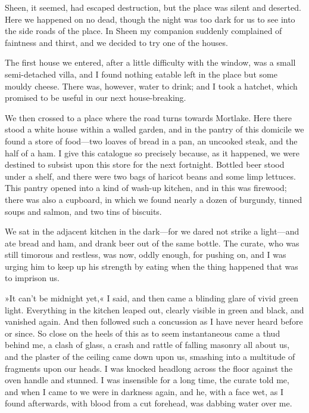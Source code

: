Sheen, it seemed, had escaped destruction, but the place was silent and deserted. Here we happened on no dead, though the night was too dark for us to see into the side roads of the place. In Sheen my companion suddenly complained of faintness and thirst,\label{cylinder5b} and we decided to try one of the houses.

The first house we entered, after a little difficulty with the window, was a small semi-detached villa, and I found nothing eatable left in the place but some mouldy cheese. There was, however, water to drink; and I took a hatchet, which promised to be useful in our next house-breaking.

We then crossed to a place where the road turns towards Mortlake. Here there stood a white house within a walled garden, and in the pantry of this domicile we found a store of food—two loaves of bread in a pan, an uncooked steak, and the half of a ham. I give this catalogue so precisely because, as it happened, we were destined to subsist upon this store for the next fortnight. Bottled beer stood under a shelf, and there were two bags of haricot beans and some limp lettuces. This pantry opened into a kind of wash-up kitchen, and in this was firewood; there was also a cupboard, in which we found nearly a dozen of burgundy, tinned soups and salmon, and two tins of biscuits.

We sat in the adjacent kitchen in the dark—for we dared not strike a light—and ate bread and ham, and drank beer out of the same bottle. The curate, who was still timorous and restless, was now, oddly enough, for pushing on, and I was urging him to keep up his strength by eating when the thing happened that was to imprison us.

»It can't be midnight yet,« I said, and then came a blinding glare of vivid green light. Everything in the kitchen leaped out, clearly visible in green and black, and vanished again. And then followed such a concussion as I have never heard before or since. So close on the heels of this as to seem instantaneous came a thud behind me, a clash of glass, a crash and rattle of falling masonry all about us, and the plaster of the ceiling came down upon us, smashing into a multitude of fragments upon our heads. I was knocked headlong across the floor against the oven handle and stunned. I was insensible for a long time, the curate told me, and when I came to we were in darkness again, and he, with a face wet, as I found afterwards, with blood from a cut forehead, was dabbing water over me.

